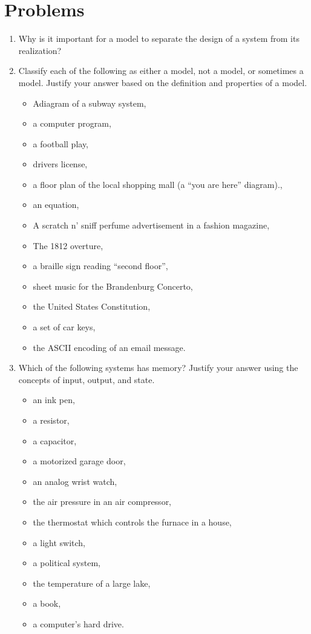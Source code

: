 
\section{Problems}
\label{problems}

\begin{enumerate}
\def\labelenumi{\arabic{enumi}.}
\item
  Why is it important for a model to separate the design of a system
  from its realization?

\item
  Classify each of the following as either a model, not a model, or
  sometimes a model. Justify your answer based on the definition and
  properties of a model.

\begin{itemize}
\def\labelenumi{\alph{enumi})}
\item Adiagram of a subway system,
\item a computer program, 
\item a football play, 
\item drivers license,
\item a floor plan of the local shopping mall (a ``you are here'' diagram)., 
\item an equation, 
\item A scratch n' sniff perfume advertisement in a fashion magazine,
\item The 1812 overture,
\item a braille sign reading ``second floor'',
\item sheet music for the Brandenburg Concerto, 
\item the United States Constitution, 
\item a set of car keys,
\item the ASCII encoding of an email message.
\end{itemize}


  \item
    Which of the following systems has memory? Justify your answer using
    the concepts of input, output, and state.
\begin{itemize}
\def\labelenumi{\alph{enumi})}
\item  an ink pen,
\item a resistor,
\item a capacitor,
\item a motorized garage door,
 \item an analog wrist watch, 
\item the air pressure in an air compressor, 
\item  the thermostat which controls the furnace in a house, 
\item a light switch, 
\item a political system,
\item the temperature of a large lake, 
\item  a book, 
\item a computer's hard drive.
\end{itemize}



\end{enumerate}
